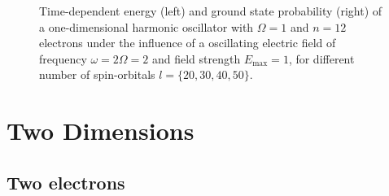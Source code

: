 \begin{figure}[!h]
{\begin{minipage}{0.6\textwidth}
    \end{minipage}
    }
    \caption{Time-dependent energy (left) and ground state probability (right)
        of a one-dimensional harmonic oscillator with $\Omega=1$
        and $n=12$ electrons under the influence of a oscillating electric field 
        of frequency $\omega = 2 \Omega = 2$ and field strength $E_\text{max}=1$,
        for different number of spin-orbitals $l=\{20,30,40,50\}$.
    }
    \label{fig:1d_n12_qd}
\end{figure}

\pagebreak

\section{Two Dimensions}
\label{app:supp_2d_qd_results}

\subsection*{Two electrons}

